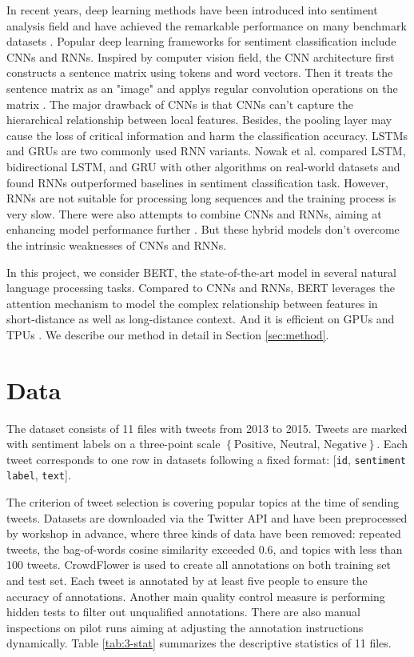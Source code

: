 \documentclass[runningheads]{llncs}
\begin{document}
In recent years, deep learning methods have been introduced into sentiment analysis field and have achieved the remarkable performance on many benchmark datasets \cite{2019sa}. Popular deep learning frameworks for sentiment classification include CNNs and RNNs. Inspired by computer vision field, the CNN architecture first constructs a sentence matrix using tokens and word vectors. Then it treats the sentence matrix as an "image" and applys regular convolution operations on the matrix \cite{cnns}. The major drawback of CNNs is that CNNs can't capture the hierarchical relationship between local features. Besides, the pooling layer may cause the loss of critical information and harm the classification accuracy. LSTMs and GRUs are two commonly used RNN variants. Nowak et al. \cite{rnns} compared LSTM, bidirectional LSTM, and GRU with other algorithms on real-world datasets and found RNNs outperformed baselines in sentiment classification task. However, RNNs are not suitable for processing long sequences and the training process is very slow. There were also attempts to combine CNNs and RNNs, aiming at enhancing model performance further \cite{com1}\cite{com2}. But these hybrid models don't overcome the intrinsic weaknesses of CNNs and RNNs.

In this project, we consider BERT, the state-of-the-art model in several natural language processing tasks. Compared to CNNs and RNNs, BERT leverages the attention mechanism to model the complex relationship between features in short-distance as well as long-distance context. And it is efficient on GPUs and TPUs \cite{bert}. We describe our method in detail in Section \ref{sec:method}.

\section{Data}

The dataset consists of 11 files with tweets from 2013 to 2015. Tweets are marked with sentiment labels on a three-point scale $\left\{ \text{Positive, Neutral, Negative} \right\}$. Each tweet corresponds to one row in datasets following a fixed format: [\texttt{id}, \texttt{sentiment label}, \texttt{text}].

The criterion of tweet selection is covering popular topics at the time of sending tweets. Datasets are downloaded via the Twitter API and have been preprocessed by workshop in advance, where three kinds of data have been removed: repeated tweets, the bag-of-words cosine similarity exceeded 0.6, and topics with less than 100 tweets. CrowdFlower is used to create all annotations on both training set and test set. Each tweet is annotated by at least five people to ensure the accuracy of annotations. Another main quality control measure is performing hidden tests to filter out unqualified annotations. There are also manual inspections on pilot runs aiming at adjusting the annotation instructions dynamically. Table \ref{tab:3-stat} summarizes the descriptive statistics of 11 files.
\end{document}
